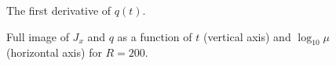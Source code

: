 \documentclass[a4paper,11pt,twoside]{article}
\begin{document}
	\begin{figure}[!h]
        \centering{}
		\caption{The first derivative of $q(t)$.}
		\label{fig:qd}
	\end{figure}   	

	\begin{figure}[!h]
        \centering{}
		\caption{Full image of $J_{x}$ and $q$ as a function of $t$ (vertical axis) and $\log_{10}\mu$ (horizontal axis) for $R=200$.}
		\label{fig:fullqJx}
	\end{figure}   	

%
\printbibliography
%
\end{document}
